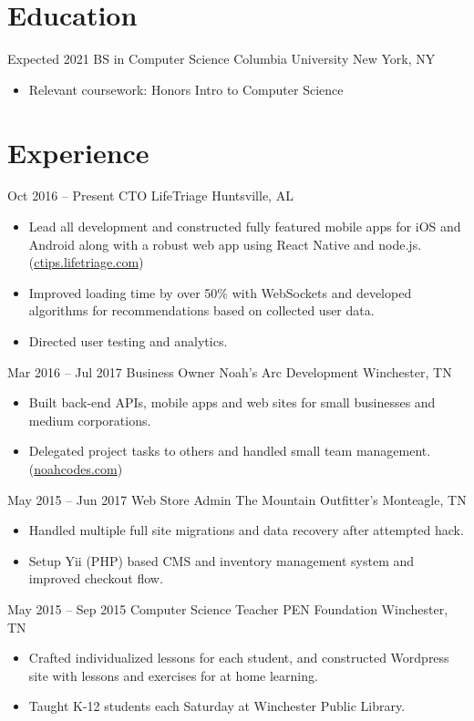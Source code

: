 \documentclass[letterpaper]{moderncv}        %
\begin{document}
\makecvtitle
\section{Education}
\cventry
{Expected 2021}
{BS in Computer Science}
{Columbia University}
{New York, NY}
{}
{\begin{itemize}%
	\item Relevant coursework: Honors Intro to Computer Science
	\end{itemize}}
\section{Experience}
\cventry
{Oct 2016 -- Present}
{CTO}
{LifeTriage}
{Huntsville, AL}
{}
{\begin{itemize}%
	\item Lead all development and constructed fully featured mobile apps for iOS and Android along with a robust web app using React Native and node.js. (\href{https://ctips.lifetriage.com}{ctips.lifetriage.com})
	\item Improved loading time by over 50\% with WebSockets and developed algorithms for recommendations based on collected user data.
	\item Directed user testing and analytics.
	\end{itemize}}
\cventry
{Mar 2016 -- Jul 2017}
{Business Owner}
{Noah's Arc Development}
{Winchester, TN}
{}
{\begin{itemize}%
	\item  Built back-end APIs, mobile apps and web sites for small businesses and medium corporations.
	\item  Delegated project tasks to others and handled small team management. (\href{https://noahcodes.com/}{noahcodes.com})
	\end{itemize}}
\cventry
{May 2015 -- Jun 2017}
{Web Store Admin}
{The Mountain Outfitter's}
{Monteagle, TN}
{}
{\begin{itemize}%
	\item  Handled multiple full site migrations and data recovery after attempted hack.
	\item  Setup Yii (PHP) based CMS and inventory management system and improved checkout flow.
	\end{itemize}}
\cventry
{May 2015 -- Sep 2015}
{Computer Science Teacher}
{PEN Foundation}
{Winchester, TN}
{}
{\begin{itemize}%
	\item  Crafted individualized lessons for each student, and constructed Wordpress site with lessons and exercises for at home learning.
	\item Taught K-12 students each Saturday at Winchester Public Library.
	\end{itemize}}
\end{document}
